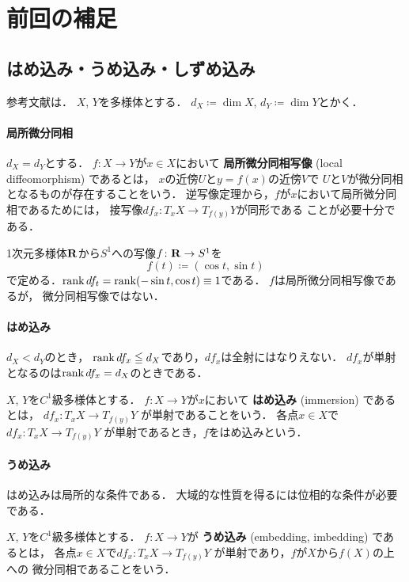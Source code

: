 \clearpage
\appendix

\section{前回の補足}
\subsection{はめ込み・うめ込み・しずめ込み}
参考文献は\cite{GP74}．
\(X\), \(Y\)を多様体とする．
\(d_X\coloneqq\dim X\), \(d_Y\coloneqq \dim Y\)とかく．

\paragraph{局所微分同相}
\(d_X=d_Y\)とする．
\(f\colon X\to Y\)が\(x\in X\)において
\textbf{局所微分同相写像} (local diffeomorphism) 
であるとは，
\(x\)の近傍\(U\)と\(y=f(x)\)の近傍\(V\)で
\(U\)と\(V\)が微分同相となるものが存在することをいう．
逆写像定理から，\(f\)が\(x\)において局所微分同相であるためには，
接写像\(df_x\colon T_xX\to T_{f(y)}Y\)が同形である
ことが必要十分である．
\begin{EG}
    1次元多様体\(\mathbf{R}\)から\(S^1\)への写像\(f\colon\mathbf{R}\to S^1\)を
    \[
        f(t)\coloneqq (\cos{t},\sin{t})
    \]で定める．\(\mathop{\mathrm{rank}}\nolimits df_t=\mathop{\mathrm{rank}}\nolimits(-\sin{t},\cos{t})\equiv 1\)である．
    \(f\)は局所微分同相写像であるが，
    微分同相写像ではない．
\end{EG}

\paragraph{はめ込み}
\(d_X<d_Y\)のとき，
\(\mathop{\mathrm{rank}}\nolimits{df_x}\leqq d_X\)であり，\(df_x\)は全射にはなりえない．
\(df_x\)が単射となるのは\(\mathop{\mathrm{rank}}\nolimits{df_x}=d_X\)のときである．
\begin{DFN}
    \(X\), \(Y\)を\(C^1\)級多様体とする．
    \(f\colon X\to Y\)が\(x\)において
    \textbf{はめ込み} (immersion) 
    であるとは，
    \(df_x\colon T_xX\to T_{f(y)}Y\)
    が単射であることをいう．
    各点\(x\in X\)で\(df_x\colon T_xX\to T_{f(y)}Y\)
    が単射であるとき，\(f\)をはめ込みという．
\end{DFN}

\paragraph{うめ込み}
はめ込みは局所的な条件である．
大域的な性質を得るには位相的な条件が必要である．
\begin{DFN}
    \(X\), \(Y\)を\(C^1\)級多様体とする．
    \(f\colon X\to Y\)が
    \textbf{うめ込み} (embedding, imbedding) 
    であるとは，
    各点\(x\in X\)で\(df_x\colon T_xX\to T_{f(y)}Y\)
    が単射であり，\(f\)が\(X\)から\(f(X)\)の上への
    微分同相であることをいう．
\end{DFN}

